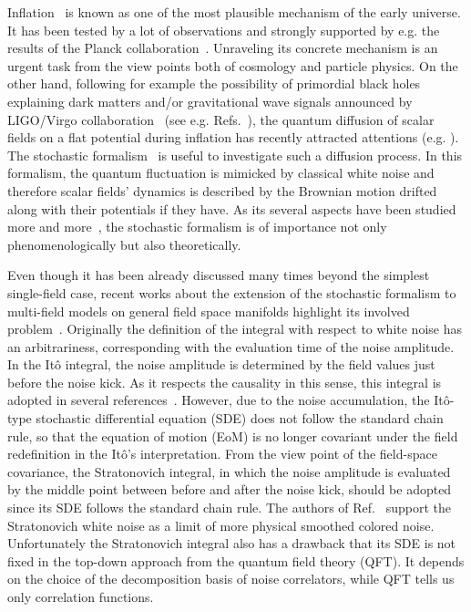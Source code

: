 \documentclass[aps, prd
, preprint
, nofootinbib 
, superscriptaddress
, longbibliography
]{revtex4-1}
\begin{document}
Inflation~\cite{Starobinsky:1980te,Sato:1980yn,Guth:1980zm,Linde:1981mu,Albrecht:1982wi,Linde:1983gd} is known as 
one of the most plausible mechanism of the early universe. It has been tested by a lot of observations and strongly supported by
e.g. the results of the Planck collaboration~\cite{Ade:2013sjv,Adam:2015rua}. Unraveling its concrete mechanism is an urgent task from the view points both of
cosmology and particle physics. On the other hand, following for example 
the possibility of primordial black holes explaining dark matters and/or gravitational wave signals announced by LIGO/Virgo
collaboration~\cite{Abbott:2016blz,Abbott:2016nmj,Abbott:2017vtc} (see e.g. Refs.~\cite{Sasaki:2018dmp}),
the quantum diffusion of scalar fields on a flat potential during inflation has recently attracted attentions (e.g. \cite{Espinosa:2017sgp,Ezquiaga:2018gbw}).
The stochastic formalism~\cite{Starobinsky:1986fx,Nambu:1987ef,Nambu:1988je,Kandrup:1988sc,Nakao:1988yi,Nambu:1989uf,Morikawa:1989xz,Mollerach:1990zf,
Linde:1993xx,Starobinsky:1994bd} is useful to investigate such a diffusion process.
In this formalism, the quantum fluctuation is mimicked by classical white noise and therefore
scalar fields' dynamics is described by the Brownian motion drifted along with their potentials
if they have. As its several aspects have been studied more and more~\cite{}, 
the stochastic formalism is of importance not only phenomenologically but also theoretically.

Even though it has been already discussed many times beyond the simplest single-field case,
recent works about the extension of the stochastic formalism to multi-field models on
general field space manifolds highlight its involved problem~\cite{Pinol:2018euk,2nd}.
Originally the definition of the integral with respect to white noise has an arbitrariness,
corresponding with the evaluation time of the noise amplitude.
In the It\^o integral, the noise amplitude is determined by the field values just before the noise kick.
As it respects the causality in this sense, this integral is adopted in several references~\cite{Salopek:1990re,Vilenkin:1999kd,Tolley:2008na,Fujita:2014tja,
Vennin:2015hra,Tokuda:2017fdh}.
However, due to the noise accumulation, the It\^o-type stochastic differential equation (SDE)
does not follow the standard chain rule, so that the equation of motion (EoM) is no longer 
covariant under the field redefinition in the It\^o's interpretation.
From the view point of the field-space covariance, the Stratonovich integral, in which 
the noise amplitude is evaluated by the middle point between before and after the noise kick,
should be adopted since its SDE follows the standard chain rule.
The authors of Ref.~\cite{Mezhlumian:1991hw} support the Stratonovich white noise as a limit of more physical
smoothed colored noise.
Unfortunately the Stratonovich integral also has a drawback that its SDE is not fixed in
the top-down approach from the quantum field theory (QFT). It depends on the choice of 
the decomposition basis of noise correlators, while QFT tells us only correlation functions.
\end{document}
